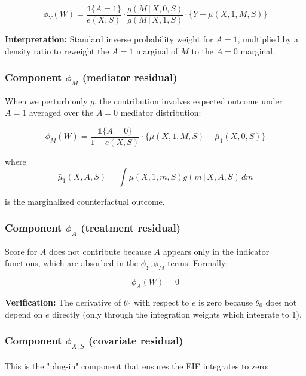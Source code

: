 \documentclass[11pt]{article}
\theoremstyle{plain}
\theoremstyle{definition}
\theoremstyle{remark}
\newcommand{\given}{\,|\,}
\newcommand{\ind}{\mathbb{1}}
\begin{document}
\begin{equation}
    \phi_Y(W) = \frac{\ind\{A = 1\}}{e(X, S)} \cdot \frac{g(M \given X, 0, S)}{g(M \given X, 1, S)} \cdot \{Y - \mu(X, 1, M, S)\}
\end{equation}

\textbf{Interpretation:} Standard inverse probability weight for $A=1$, multiplied by a density ratio to reweight the $A=1$ marginal of $M$ to the $A=0$ marginal.

\subsubsection{Component $\phi_M$ (mediator residual)}

When we perturb only $g$, the contribution involves expected outcome under $A=1$ averaged over the $A=0$ mediator distribution:

\begin{equation}
    \phi_M(W) = \frac{\ind\{A = 0\}}{1 - e(X, S)} \cdot \big\{ \mu(X, 1, M, S) - \bar\mu_1(X, 0, S) \big\}
\end{equation}

where 
\begin{equation}
\bar\mu_1(X, A, S) = \int \mu(X, 1, m, S) g(m \given X, A, S) \, dm
\end{equation}

is the marginalized counterfactual outcome.

\subsubsection{Component $\phi_A$ (treatment residual)}

Score for $A$ does not contribute because $A$ appears only in the indicator functions, which are absorbed in the $\phi_Y, \phi_M$ terms. Formally:

\begin{equation}
    \phi_A(W) = 0
\end{equation}

\textbf{Verification:} The derivative of $\theta_0$ with respect to $e$ is zero because $\theta_0$ does not depend on $e$ directly (only through the integration weights which integrate to 1).

\subsubsection{Component $\phi_{X,S}$ (covariate residual)}

This is the "plug-in" component that ensures the EIF integrates to zero:
\end{document}
